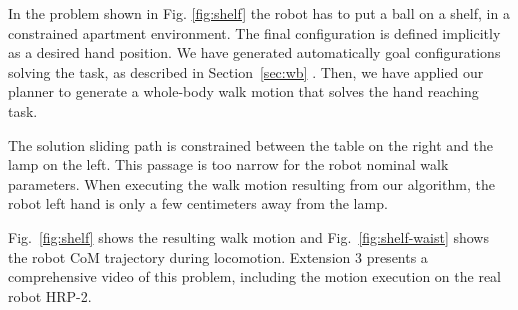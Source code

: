\documentclass{article}
\begin{document}
In the problem shown in Fig. \ref{fig:shelf} the robot has to put a ball on a
shelf, in a constrained apartment environment. The final configuration is defined 
implicitly as a desired hand position. We have generated automatically goal configurations 
solving the task, as described in Section~\ref{sec:wb} . Then, we have
applied our planner to generate a whole-body walk motion that solves the hand reaching
task. 

The solution sliding path is constrained between the table on the right and the lamp
on the left. This passage is too narrow for the robot nominal walk parameters. 
When executing the walk motion resulting from our algorithm, the robot left hand
is only a few centimeters away from the lamp.

Fig.~\ref{fig:shelf} shows the resulting walk motion and Fig.~\ref{fig:shelf-waist} 
shows the robot CoM trajectory during locomotion. Extension 3 presents a 
comprehensive video of this problem, including the motion execution on
the real robot HRP-2.
\end{document}
